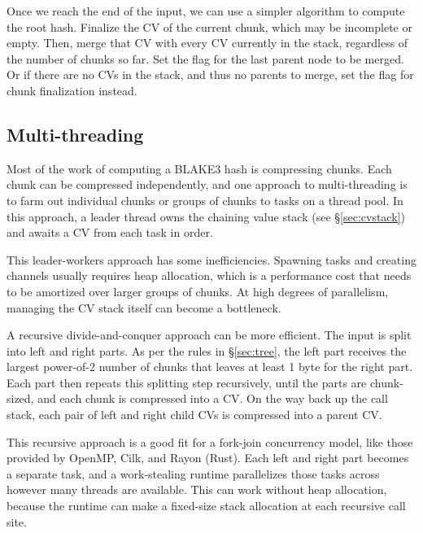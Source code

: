 \documentclass[11pt,notitlepage,a4paper]{article}
\newcommand{\flag}[1]{\texttt{\detokenize{#1}}\xspace}
\begin{document}
Once we reach the end of the input, we can use a simpler algorithm to compute
the root hash. Finalize the CV of the current chunk, which may be incomplete or
empty. Then, merge that CV with every CV currently in the stack, regardless of
the number of chunks so far. Set the \flag{ROOT} flag for the last parent node
to be merged. Or if there are no CVs in the stack, and thus no parents to
merge, set the \flag{ROOT} flag for chunk finalization instead.

\subsection{Multi-threading}\label{sec:multithreading}

Most of the work of computing a BLAKE3 hash is compressing chunks. Each chunk
can be compressed independently, and one approach to multi-threading is to farm
out individual chunks or groups of chunks to tasks on a thread pool. In this
approach, a leader thread owns the chaining value stack (see
\S\ref{sec:cvstack}) and awaits a CV from each task in order.

This leader-workers approach has some inefficiencies. Spawning tasks and
creating channels usually requires heap allocation, which is a performance cost
that needs to be amortized over larger groups of chunks. At high degrees of
parallelism, managing the CV stack itself can become a bottleneck.

A recursive divide-and-conquer approach can be more efficient. The input is
split into left and right parts. As per the rules in \S\ref{sec:tree}, the left
part receives the largest power-of-2 number of chunks that leaves at least 1
byte for the right part. Each part then repeats this splitting step
recursively, until the parts are chunk-sized, and each chunk is compressed into
a CV. On the way back up the call stack, each pair of left and right child CVs
is compressed into a parent CV.

This recursive approach is a good fit for a fork-join concurrency model, like
those provided by OpenMP, Cilk, and Rayon (Rust). Each left and right part
becomes a separate task, and a work-stealing runtime parallelizes those tasks
across however many threads are available. This can work without heap
allocation, because the runtime can make a fixed-size stack allocation at each
recursive call site.
\end{document}
